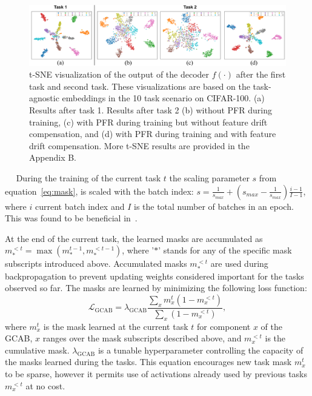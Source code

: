 \documentclass[twocolumn]{svjour3}          %
\newcommand{\minisection}[1]{\vspace{0.04in} \noindent {\bf #1}\ \ }
\begin{document}
\begin{figure}
\begin{center}
\includegraphics[width=\linewidth]{images/embedding_tag_s.pdf}
\end{center}
\caption{t-SNE visualization of the output of the decoder $f(\cdot)$ after the first task and second task.
These visualizations are based on the task-agnostic embeddings in the 10 task scenario on CIFAR-100.
(a) Results after task 1. Results after task 2 (b) without PFR during training, (c) with PFR during training but without feature drift compensation, and (d) with PFR during training and with feature drift compensation.
More t-SNE results are provided in the Appendix B.
}
\label{fig:embedding_tag_red}
\end{figure}

\minisection{Training.}
During the training of the current task $t$ 
the scaling parameter $s$ from equation~\ref{eq:mask}, is scaled with the batch index: $s = \frac{1}{s_{max}} + (s_{max}-\frac{1}{s_{max}})\frac{i-1}{I-1}$, where $i$ current batch index and $I$ is the total number of batches in an epoch. This was found to be beneficial in~\cite{serra2018overcoming}.



At the end of the current task, the learned masks are accumulated as $m_*^{<t} = \max (m_*^{t-1},m_*^{<t-1})$, where '$*$' stands for any of the specific mask subscripts introduced above. Accumulated masks $m_*^{<t}$ are used during backpropagation to prevent updating weights considered important for the tasks observed so far. The masks are learned by minimizing the following loss function:
\begin{equation}
     \mathcal{L}_{\text{GCAB}} = \lambda_{\text{GCAB}} \frac{\sum_{x} m^{t}_{x}(1-m^{<t}_{x})}{\sum_{x}(1-m^{< t}_{x})},
\end{equation}
where $m_{x}^{t}$ is the mask learned at the current task $t$ for component $x$ of the GCAB, $x$ ranges over the mask subscripts described above, and $m^{<t}_{x}$ is the cumulative mask. $\lambda_{\text{GCAB}}$ is a tunable hyperparameter controlling the capacity of the masks learned during the tasks. This equation encourages new task mask $m_x^t$ to be sparse, however it permits use of activations already used by previous tasks $m_x^{<t}$ at no cost.
\end{document}
